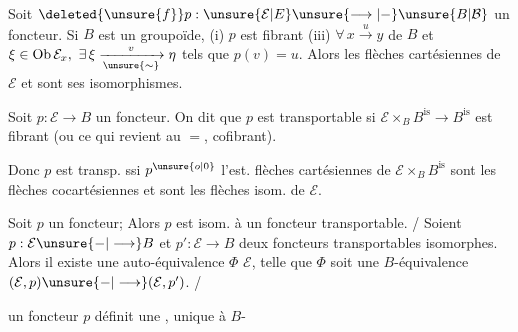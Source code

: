 
\noindent{}

Soit \(\deleted{\unsure{f}}p:\unsure{\mathcal E|E}\unsure{\longrightarrow|-}\unsure{B|\mathcal B}\) un foncteur. Si \(B\) est un groupoïde,  (i) \(p\) est fibrant    (iii) \(\forall\,x\xrightarrow{u}y\) de \(B\) \deleted{\(\unsure{\beta}\longrightarrow\unsure{\beta}\)} et \(\xi\in\operatorname{Ob}\mathcal E_x,\ \exists\,\xi\xrightarrow[\unsure{\sim}]{v}\eta\) tels que \(p(v)=u\).  Alors les flèches cartésiennes  de \(\mathcal E\) et sont  ses isomorphismes.

Soit \(p:\mathcal E\longrightarrow B\) un foncteur. On dit que \(p\) est transportable si  \(\mathcal E\times_B B^{\mathrm{is}}\longrightarrow B^{\mathrm{is}}\) est fibrant (ou ce qui revient au \(=\), cofibrant).

Donc \(p\) est  transp. ssi \(p^{\unsure{o|0}}\) l'est.  flèches cartésiennes de \(\mathcal E\times_B B^{\mathrm{is}}\) sont les flèches cocartésiennes et sont les flèches isom. de \(\mathcal E\).

Soit \(p\) un foncteur; Alors \(p\) est isom. à un foncteur transportable. / Soient \(p:\mathcal E\unsure{-|\longrightarrow}B\) et \(p':\mathcal E\longrightarrow B\) deux foncteurs transportables isomorphes. Alors il existe une auto-équivalence \(\Phi\)  \(\mathcal E\),  telle que \(\Phi\) soit une \(B\)-équivalence \((\mathcal E,p)\unsure{-|\longrightarrow}(\mathcal E,p')\). /

 un foncteur \(p\) définit une  ,     unique à \(B\)-
